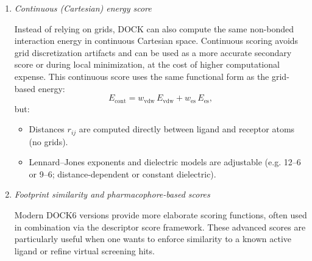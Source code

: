 \documentclass[12pt, a4paper]{article}
\begin{document}
\begin{enumerate}
A simple conceptual form of the contact score is:
\[
  S_{\text{contact}} =
    \sum_{i \in L} \sum_{j \in R} f(r_{ij}),
\]
with a pairwise function
\[
  f(r_{ij}) =
  \begin{cases}
    s_{\text{bump}} &
      \text{if } r_{ij} < \alpha (R_i + R_j), \\
    s_{\text{contact}} &
      \text{if } \alpha (R_i + R_j) \le r_{ij} \le d_{\text{cut}}, \\
    0 & \text{otherwise},
  \end{cases}
\]
where:
\begin{itemize}
  \item \(s_{\text{contact}} < 0\) denotes a favorable contact contribution.
  \item \(s_{\text{bump}} > 0\) is a penalty for steric clash.
\end{itemize}


\item \textit{Continuous (Cartesian) energy score}

Instead of relying on grids, DOCK can also compute the same non-bonded interaction energy in continuous Cartesian space. Continuous scoring avoids grid discretization artifacts and can be used as a more accurate secondary score or during local minimization, at the cost of higher computational expense.
This continuous score uses the same functional form as the grid-based energy:
\[
  E_{\text{cont}} =
    w_{\text{vdw}}\, E_{\text{vdw}} +
    w_{\text{es}}\, E_{\text{es}},
\]
but:
\begin{itemize}
  \item Distances $r_{ij}$ are computed directly between ligand and receptor atoms (no grids).
  \item Lennard--Jones exponents and dielectric models are adjustable (e.g. 12--6 or 9--6; distance-dependent or constant dielectric).
\end{itemize}


\item \textit{Footprint similarity and pharmacophore-based scores}

Modern DOCK6 versions provide more elaborate scoring functions, often used in combination via the descriptor score framework\cite{CH7_Allen2015}. These advanced scores are particularly useful when one wants to enforce similarity to a known active ligand or refine virtual screening hits. 


\end{enumerate}
\end{document}
